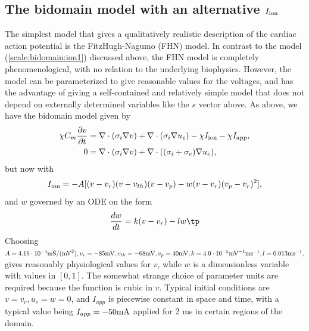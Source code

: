 \documentclass[graybox,envcountchap,sectrefs,final]{svmonodo}
\newcommand{\longinlinecomment}[3]{{\color{red}{\bf #1}: #2}}
\begin{document}


\subsection{The bidomain model with an alternative $I_{\rm{ion}}$}
The simplest model that gives a qualitatively realistic description of
the cardiac action potential is the FitzHugh-Nagumo (FHN) model. In
contrast to the model (\ref{scale:bidomain:ion1}) discussed above, the
FHN model is completely phenomenological, with no relation to the
underlying biophysics. However, the model can be parameterized to give
reasonable values for the voltages, and has the advantage of giving a
self-contained and relatively simple model that does not depend on
externally determined variables like the $s$ vector above. As above,
we have the bidomain model given by 
\begin{align}
\chi C_m\frac{\partial v}{\partial t} &=
\nabla\cdot( \sigma_i\nabla v) + \nabla\cdot (\sigma_i\nabla u_e) - \chi I_{\rm{ion}}
- \chi I_{\rm{app}},
\label{scale:bidomain:eqv2}\\ 
0 &= \nabla\cdot( \sigma_i\nabla v) + \nabla\cdot ((\sigma_i + \sigma_e)\nabla u_e),
\label{scale:bidomain:equ2}
\end{align}
but now with 
\[ I_{\rm{ion}} = -A[(v-v_r)(v-v_{th})(v-v_p) - w(v-v_r)(v_p-v_r)^2], \]
and $w$ governed by an ODE on the form
\[ \frac{dw}{dt} = k(v-v_r)-l w \tp\]
Choosing $A=4.16\cdot 10^{-4} \hbox{mS}/(\hbox{mV}^2),  v_r=-85\hbox{mV},
v_{th}= -68\hbox{mV}, v_p=40\hbox{mV}, k = 4.0\cdot10^{-5} \hbox{mV}^{-1}\hbox{ms}^{-1}, l
=0.013\hbox{ms}^{-1}, $ gives reasonably physiological values for $v$,
while $w$ is a dimensionless variable with values in $[0,1]$. 
The somewhat strange choice of parameter units are
required because the function is cubic in $v$. 
Typical initial conditions are $v=v_r, u_e = w=0$,
and $I_{app}$ is piecewise constant in space and time, with a typical
value being $I_{app} = -50 \hbox{mA}$ applied for 2 ms in certain regions of
the domain. 
\end{document}
